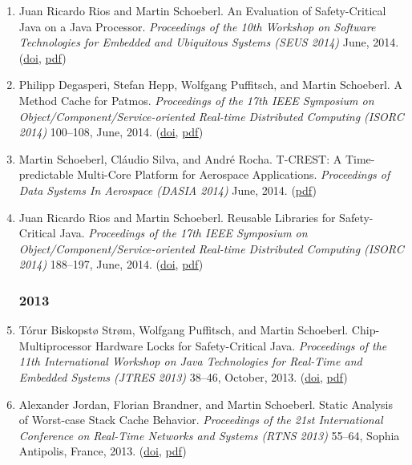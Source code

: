 \begin{enumerate}
\item Juan Ricardo Rios and Martin Schoeberl.
 An Evaluation of Safety-Critical Java on a Java Processor.
 \emph{Proceedings of the 10th Workshop on Software Technologies for Embedded and Ubiquitous Systems (SEUS 2014)} June, 2014.
(\href{http://dx.doi.org/10.1109/ISORC.2014.41}{doi}, \href{http://www.jopdesign.com/doc/jopscjeval.pdf}{pdf})

\item Philipp Degasperi, Stefan Hepp, Wolfgang Puffitsch, and Martin Schoeberl.
 A Method Cache for Patmos.
 \emph{Proceedings of the 17th IEEE Symposium on Object/Component/Service-oriented Real-time Distributed Computing (ISORC 2014)} 100--108, June, 2014.
(\href{http://dx.doi.org/10.1109/ISORC.2014.47}{doi}, \href{http://www.jopdesign.com/doc/mcpat.pdf}{pdf})

\item Martin Schoeberl, Cl\'{a}udio Silva, and Andr\'{e} Rocha.
 T-CREST: A Time-predictable Multi-Core Platform for Aerospace Applications.
 \emph{Proceedings of Data Systems In Aerospace (DASIA 2014)} June, 2014.
(\href{http://www.jopdesign.com/doc/t-crest-dasia.pdf}{pdf})

\item Juan Ricardo Rios and Martin Schoeberl.
 Reusable Libraries for Safety-Critical Java.
 \emph{Proceedings of the 17th IEEE Symposium on Object/Component/Service-oriented Real-time Distributed Computing (ISORC 2014)} 188--197, June, 2014.
(\href{http://dx.doi.org/10.1109/ISORC.2014.27}{doi}, \href{http://www.jopdesign.com/doc/scjlibs.pdf}{pdf})


\subsubsection*{2013}

\item T{\'o}rur Biskopst{\o} Str{\o}m, Wolfgang Puffitsch, and Martin Schoeberl.
 Chip-Multiprocessor Hardware Locks for Safety-Critical Java.
 \emph{Proceedings of the 11th International Workshop on Java Technologies for Real-Time and Embedded Systems (JTRES 2013)} 38--46, October, 2013.
(\href{http://dx.doi.org/10.1145/2512989.2512995}{doi}, \href{http://www.jopdesign.com/doc/cmphwlocks.pdf}{pdf})

\item Alexander Jordan, Florian Brandner, and Martin Schoeberl.
 Static Analysis of Worst-case Stack Cache Behavior.
 \emph{Proceedings of the 21st International Conference on Real-Time Networks and Systems (RTNS 2013)} 55--64, Sophia Antipolis, France, 2013.
(\href{http://dx.doi.org/10.1145/2516821.2516828}{doi}, \href{http://doi.acm.org/10.1145/2516821.2516828}{pdf})


\end{enumerate}
